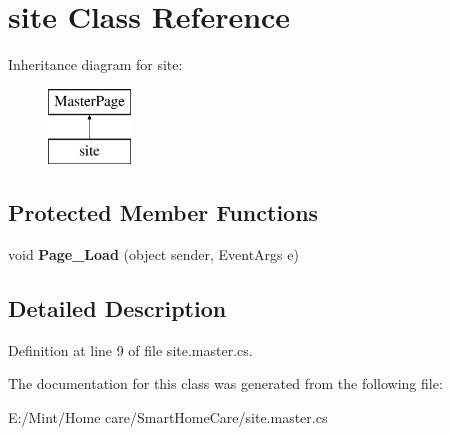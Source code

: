 \hypertarget{classsite}{\section{site Class Reference}
\label{classsite}
}
Inheritance diagram for site\-:\begin{figure}[H]
\begin{center}
\leavevmode
\includegraphics[height=2.000000cm]{classsite}
\end{center}
\end{figure}
\subsection*{Protected Member Functions}
\begin{DoxyCompactItemize}
\item 
\hypertarget{classsite_a91dce9b8a24da8fdecd43b16c218969d}{void {\bfseries Page\-\_\-\-Load} (object sender, Event\-Args e)}\label{classsite_a91dce9b8a24da8fdecd43b16c218969d}

\end{DoxyCompactItemize}


\subsection{Detailed Description}


Definition at line 9 of file site.\-master.\-cs.



The documentation for this class was generated from the following file\-:\begin{DoxyCompactItemize}
\item 
E\-:/\-Mint/\-Home care/\-Smart\-Home\-Care/site.\-master.\-cs\end{DoxyCompactItemize}
